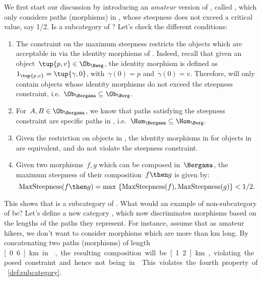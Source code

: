 We first start our discussion by introducing an \emph{amateur} version of \Berg, called \Bergama, which only considers paths (morphisms) in \Berg, whose steepness does not exceed a critical value, say 1/2. Is \Bergama a subcategory of \Berg? Let's check the different conditions:
\begin{enumerate}
    \item The constraint on the maximum steepness restricts the objects which are acceptable in \Bergama via the identity morphisms of \Berg. Indeed, recall that given an object~$\tup{p,v}\in \Ob_{\Berg}$, the identity morphism is defined as~$1_{\tup{p,v}}=\tup{\gamma,0}$, with~$\gamma(0)=p$ and~$\dot{\gamma}(0)=v$. Therefore, \Bergama will only contain objects whose identity morphisms do not exceed the steepness constraint, i.e.~$\Ob_\Bergama \subseteq \Ob_\Berg$.
    \item For~$A,B\in \Ob_{\Bergama}$, we know that paths satisfying the steepness constraint are specific paths in \Berg, i.e.~$\Hom_{\Bergama}\subseteq \Hom_{\Berg}$.
    \item Given the restriction on objects in \Bergama, the identity morphisms in \Berg for objects in \Bergama are equivalent, and do not violate the steepness constraint.
    \item Given two morphisms~$f,g$ which can be composed in~$\Bergama$, the maximum steepness of their composition~$f\then g$ is given by:
    \begin{equation*}
        \text{MaxSteepness}(f\then g)=\max \ \{\text{MaxSteepness}(f),\text{MaxSteepness}(g)\}<1/2.
    \end{equation*}
\end{enumerate}

This shows that \Bergama is a subcategory of \Berg. What would an example of non-subcategory of \Berg be? Let's define a new category \Berglazy, which now discriminates morphisms based on the lengths of the paths they represent. For instance, assume that as amateur hikers, we don't want to consider morphisms which are more than \unit[1]{km} long. By concatenating two paths (morphisms) of length \unit[0.6]{km} in \Berglazy, the resulting composition will be \unit[1.2]{km}, violating the posed constraint and hence not being in \Berglazy. This violates the fourth property of \cref{def:subcategory}.



